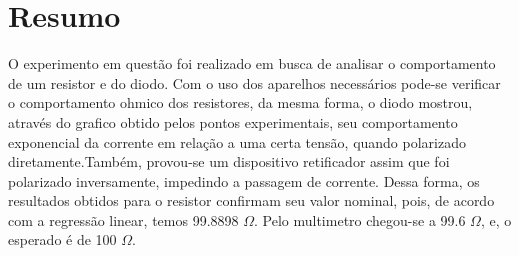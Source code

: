 \section{Resumo}
    O experimento em questão foi realizado em busca de analisar o comportamento de um resistor e do diodo.
Com o uso dos aparelhos necessários pode-se verificar o comportamento ohmico dos resistores, da mesma forma,
o diodo mostrou, através do grafico obtido pelos pontos experimentais, seu comportamento exponencial da corrente em
relação a uma certa tensão, quando polarizado diretamente.Também, provou-se um dispositivo retificador assim
que foi polarizado inversamente, impedindo a passagem de corrente. 
Dessa forma, os resultados obtidos para o resistor confirmam seu valor nominal, pois, de acordo com a regressão linear,
temos 99.8898 $\Omega$. Pelo multimetro chegou-se a 99.6 $\Omega$, e, o esperado é de 100 $\Omega$.